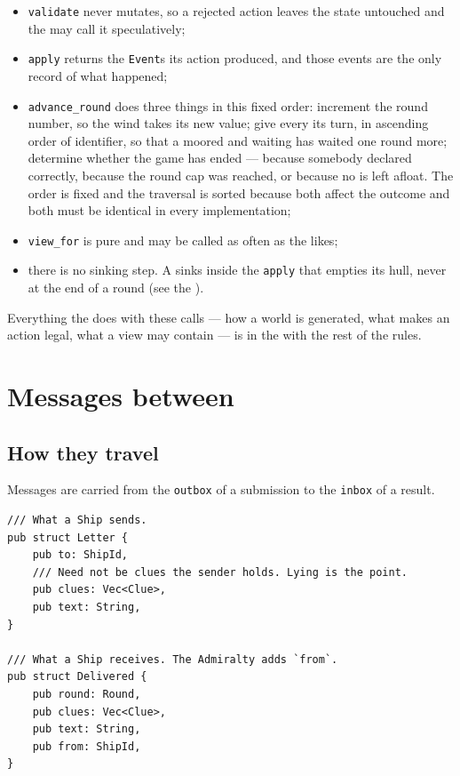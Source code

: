\documentclass{article}
\begin{document}
\begin{itemize}
    \item \texttt{validate} never mutates, so a rejected action leaves the state untouched and the
      \admiralty{} may call it speculatively;
    \item \texttt{apply} returns the \texttt{Event}s its action produced, and those events are the
      only record of what happened;
    \item \texttt{advance\_round} does three things in this fixed order: increment the round
      number, so the wind takes its new value; give every \island{} its turn, in ascending order
      of identifier, so that a \ship{} moored and waiting has waited one round more; determine
      whether the game has ended --- because somebody declared correctly, because the round cap
      was reached, or because no \ship{} is left afloat. The order is fixed and the traversal is
      sorted because both affect the outcome and both must be identical in every implementation;
    \item \texttt{view\_for} is pure and may be called as often as the \admiralty{} likes;
    \item there is no sinking step. A \ship{} sinks inside the \texttt{apply} that empties its
      hull, never at the end of a round (see the \MD).
\end{itemize}

Everything the \chart{} does with these calls --- how a world is generated, what makes an action
legal, what a view may contain --- is in the \MD{} with the rest of the rules.

\newpage
\section{Messages between \ships}
\label{proto:mail}

\subsection{How they travel}

Messages are carried from the \texttt{outbox} of a
submission to the \texttt{inbox} of a result.

\begin{lstlisting}
/// What a Ship sends.
pub struct Letter {
    pub to: ShipId,
    /// Need not be clues the sender holds. Lying is the point.
    pub clues: Vec<Clue>,
    pub text: String,
}

/// What a Ship receives. The Admiralty adds `from`.
pub struct Delivered {
    pub round: Round,
    pub clues: Vec<Clue>,
    pub text: String,
    pub from: ShipId,
}
\end{lstlisting}
\end{document}
